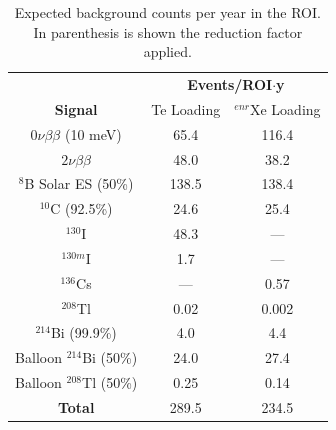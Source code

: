 \begin{table}
\centering
\begin{tabular}{ccc}
\toprule
                          & \multicolumn{2}{c}{\bf Events/ROI$\cdot$y} \\
{\bf Signal}              & Te Loading & $^{enr}$Xe Loading \\
\midrule
$0\nu\beta\beta$ (10 meV) & 65.4       & 116.4      \\
\midrule
$2\nu\beta\beta$          & 48.0       & 38.2       \\
$^8$B Solar ES  (50\%)           & 138.5      & 138.4      \\
$^{10}$C  (92.5\%)                & 24.6       & 25.4       \\
$^{130}$I                 & 48.3       & ---        \\
$^{130m}$I                & 1.7        & ---        \\
$^{136}$Cs                & ---        & 0.57       \\
$^{208}$Tl                & 0.02       & 0.002      \\
$^{214}$Bi  (99.9\%)               & 4.0        & 4.4        \\
Balloon $^{214}$Bi  (50\%)       & 24.0       & 27.4       \\
Balloon $^{208}$Tl  (50\%)      & 0.25       & 0.14       \\
\midrule
{\bf Total}               & 289.5      & 234.5      \\
\bottomrule
\end{tabular}
\caption{Expected background counts per year in the ROI. In parenthesis is shown the reduction factor applied.}
\label{tab:counts}
\end{table}

